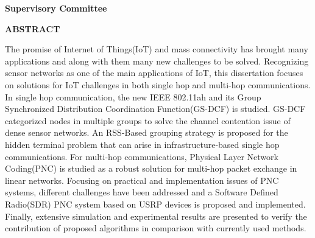 \newpage
{}

\noindent \textbf{Supervisory Committee}
\tpbreak
\panel

\begin{center}
\textbf{ABSTRACT}
\end{center}

The promise of Internet of Things(IoT) and mass connectivity has brought many applications and along with them many new challenges to be solved. Recognizing sensor networks as one of the main applications of IoT, this dissertation focuses on solutions for IoT challenges in both single hop and multi-hop communications. In single hop communication, the new IEEE 802.11ah and its Group Synchronized Distribution Coordination Function(GS-DCF) is studied. GS-DCF categorized nodes in multiple groups to solve the channel contention issue of dense sensor networks. An RSS-Based grouping strategy is proposed for the hidden terminal problem that can arise in infrastructure-based single hop communications. For multi-hop communications, Physical Layer Network Coding(PNC) is studied as a robust solution for multi-hop packet exchange in linear networks. Focusing on practical and implementation issues of PNC systems, different challenges have been addressed and a Software Defined Radio(SDR) PNC system based on USRP devices is proposed and implemented. Finally, extensive simulation and experimental results are presented to verify the contribution of proposed algorithms in comparison with currently used methods.